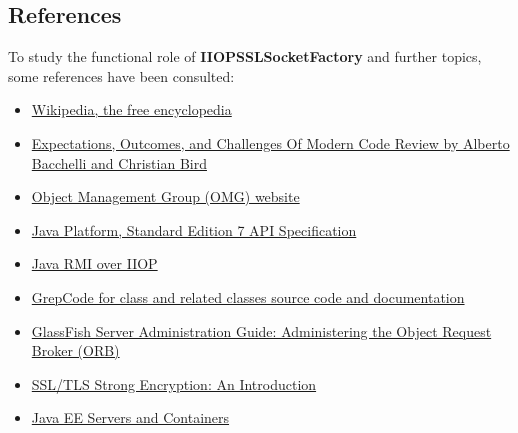 \subsection{References}
To study the functional role of \textbf{IIOPSSLSocketFactory} and further topics, some references have been consulted:
\begin{itemize}
	\item \href{https://www.wikipedia.org/}{Wikipedia, the free encyclopedia}
	\item \href{http://research.microsoft.com/pubs/180283/ICSE\%202013-codereview.pdf}{Expectations, Outcomes, and Challenges Of Modern Code Review by Alberto Bacchelli and Christian Bird}
	\item \href{http://www.omg.org/}{Object Management Group (OMG) website}
	\item \href{http://docs.oracle.com/javase/7/docs/api/overview-summary.html}{Java Platform, Standard Edition 7 API Specification}
	\item \href{http://docs.oracle.com/javase/7/docs/technotes/guides/rmi-iiop/index.html}{Java RMI over IIOP}
	\item \href{http://grepcode.com/file/repo1.maven.org/maven2/org.glassfish.main.orb/orb-iiop/4.0/org/glassfish/enterprise/iiop/impl/IIOPSSLSocketFactory.java}{GrepCode for class and related classes source code and documentation}  
	\item \href{http://docs.oracle.com/cd/E26576_01/doc.312/e24928/orb.htm\#GSADG00018}{GlassFish Server Administration Guide: Administering the Object Request Broker (ORB)}
	\item \href{https://httpd.apache.org/docs/trunk/ssl/ssl_intro.html}{SSL/TLS Strong Encryption: An Introduction}
	\item \href{https://docs.oracle.com/javaee/7/firstcup/java-ee002.htm}{Java EE Servers and Containers}
\end{itemize}



